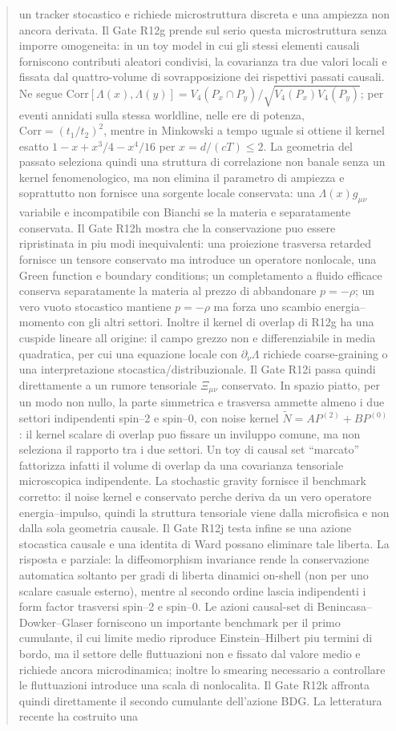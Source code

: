 \documentclass[11pt,a4paper]{article}
\begin{document}
\begin{abstract}
un tracker stocastico e richiede microstruttura discreta e una ampiezza non ancora derivata. Il Gate R12g prende sul serio questa microstruttura senza imporre omogeneita: in un toy model in cui gli stessi elementi causali forniscono contributi aleatori condivisi, la covarianza tra due valori locali e fissata dal quattro-volume di sovrapposizione dei rispettivi passati causali. Ne segue $\mathrm{Corr}[\Lambda(x),\Lambda(y)]=V_4(P_x\cap P_y)/\sqrt{V_4(P_x)V_4(P_y)}$; per eventi annidati sulla stessa worldline, nelle ere di potenza, $\mathrm{Corr}=(t_1/t_2)^2$, mentre in Minkowski a tempo uguale si ottiene il kernel esatto $1-x+x^3/4-x^4/16$ per $x=d/(cT)\le2$. La geometria del passato seleziona quindi una struttura di correlazione non banale senza un kernel fenomenologico, ma non elimina il parametro di ampiezza e soprattutto non fornisce una sorgente locale conservata: una $\Lambda(x)g_{\mu\nu}$ variabile e incompatibile con Bianchi se la materia e separatamente conservata. Il Gate R12h mostra che la conservazione puo essere ripristinata in piu modi inequivalenti: una proiezione trasversa retarded fornisce un tensore conservato ma introduce un operatore nonlocale, una Green function e boundary conditions; un completamento a fluido efficace conserva separatamente la materia al prezzo di abbandonare $p=-\rho$; un vero vuoto stocastico mantiene $p=-\rho$ ma forza uno scambio energia--momento con gli altri settori. Inoltre il kernel di overlap di R12g ha una cuspide lineare all origine: il campo grezzo non e differenziabile in media quadratica, per cui una equazione locale con $\partial_\nu\Lambda$ richiede coarse-graining o una interpretazione stocastica/distribuzionale. Il Gate R12i passa quindi direttamente a un rumore tensoriale $\Xi_{\mu\nu}$ conservato. In spazio piatto, per un modo non nullo, la parte simmetrica e trasversa ammette almeno i due settori indipendenti spin--2 e spin--0, con noise kernel $\widetilde N=A P^{(2)}+B P^{(0)}$: il kernel scalare di overlap puo fissare un inviluppo comune, ma non seleziona il rapporto tra i due settori. Un toy di causal set ``marcato'' fattorizza infatti il volume di overlap da una covarianza tensoriale microscopica indipendente. La stochastic gravity fornisce il benchmark corretto: il noise kernel e conservato perche deriva da un vero operatore energia--impulso, quindi la struttura tensoriale viene dalla microfisica e non dalla sola geometria causale. Il Gate R12j testa infine se una azione stocastica causale e una identita di Ward possano eliminare tale liberta. La risposta e parziale: la diffeomorphism invariance rende la conservazione automatica soltanto per gradi di liberta dinamici on-shell (non per uno scalare casuale esterno), mentre al secondo ordine lascia indipendenti i form factor trasversi spin--2 e spin--0. Le azioni causal-set di Benincasa--Dowker--Glaser forniscono un importante benchmark per il primo cumulante, il cui limite medio riproduce Einstein--Hilbert piu termini di bordo, ma il settore delle fluttuazioni non e fissato dal valore medio e richiede ancora microdinamica; inoltre lo smearing necessario a controllare le fluttuazioni introduce una scala di nonlocalita. Il Gate R12k affronta quindi direttamente il secondo cumulante dell'azione BDG. La letteratura recente ha costruito una 
\end{abstract}
\end{document}
